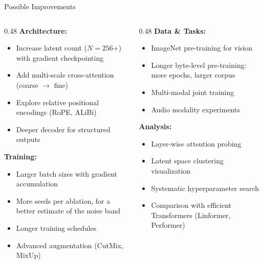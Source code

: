 \documentclass[aspectratio=169,11pt]{beamer}
\begin{document}
\begin{frame}[shrink=9]{Possible Improvements}
  \begin{columns}[T]
    \begin{column}{0.48\textwidth}
      \textbf{Architecture:}
      \begin{itemize}
        \item Increase latent count ($N = 256$+) with gradient checkpointing
        \item Add multi-scale cross-attention (coarse $\rightarrow$ fine)
        \item Explore relative positional encodings (RoPE, ALiBi)
        \item Deeper decoder for structured outputs
      \end{itemize}

      \vspace{0.5em}
      \textbf{Training:}
      \begin{itemize}
        \item Larger batch sizes with gradient accumulation
        \item More seeds per ablation, for a better estimate of the noise band
        \item Longer training schedules
        \item Advanced augmentation (CutMix, MixUp)
      \end{itemize}
    \end{column}
    \begin{column}{0.48\textwidth}
      \textbf{Data \& Tasks:}
      \begin{itemize}
        \item ImageNet pre-training for vision
        \item Longer byte-level pre-training: more epochs, larger corpus
        \item Multi-modal joint training
        \item Audio modality experiments
      \end{itemize}

      \vspace{0.5em}
      \textbf{Analysis:}
      \begin{itemize}
        \item Layer-wise attention probing
        \item Latent space clustering visualization
        \item Systematic hyperparameter search
        \item Comparison with efficient Transformers (Linformer, Performer)
      \end{itemize}
    \end{column}
  \end{columns}
\end{frame}
\end{document}
